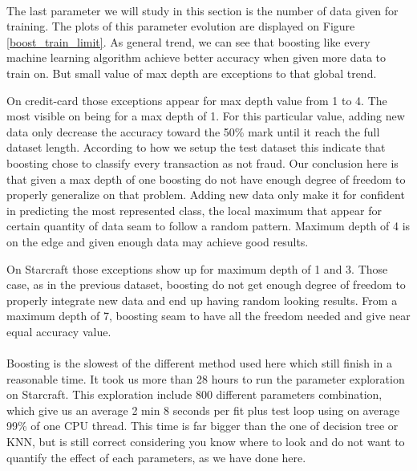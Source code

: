 \documentclass[twocolumn,a4paper,10pt]{article}
\begin{document}
\paragraph{}
The last parameter we will study in this section is the number of data given for training. The plots of this parameter evolution are displayed on Figure \ref{boost_train_limit}. As general trend, we can see that boosting like every machine learning algorithm achieve better accuracy when given more data to train on. But small value of max depth are exceptions to that global trend.

On credit-card those exceptions appear for max depth value from 1 to 4. The most visible on being for a max depth of 1. For this particular value, adding new data only decrease the accuracy toward the 50\% mark until it reach the full dataset length. According to how we setup the test dataset this indicate that boosting chose to classify every transaction as not fraud. Our conclusion here is that given a max depth of one boosting do not have enough degree of freedom to properly generalize on that problem. Adding new data only make it for confident in predicting the most represented class, the local maximum that appear for certain quantity of data seam to follow a random pattern. Maximum depth of 4 is on the edge and given enough data may achieve good results.

On Starcraft those exceptions show up for maximum depth of 1 and 3. Those case, as in the previous dataset, boosting do not get enough degree of freedom to properly integrate new data and end up having random looking results. From a maximum depth of 7, boosting seam to have all the freedom needed and give near equal accuracy value.

\paragraph{}
Boosting is the slowest of the different method used here which still finish in a reasonable time. It took us more than 28 hours to run the parameter exploration on Starcraft. This exploration include 800 different parameters combination, which give us an average 2 min 8 seconds per fit plus test loop using on average 99\% of one CPU thread. This time is far bigger than the one of decision tree or KNN, but is still correct considering you know where to look and do not want to quantify the effect of each parameters, as we have done here.
\end{document}
